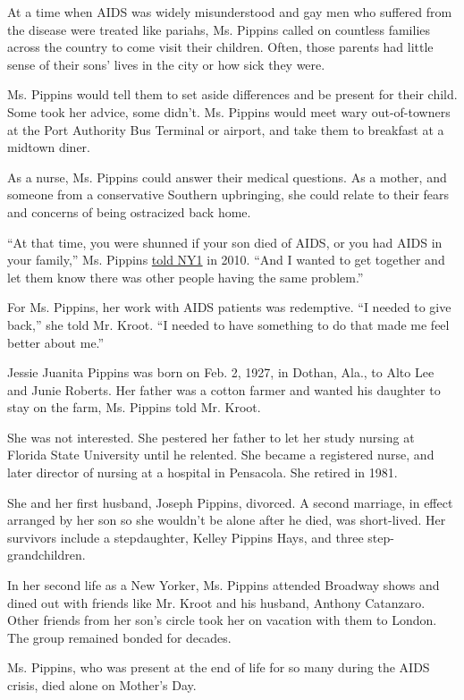 At a time when AIDS was widely misunderstood and gay men who suffered
from the disease were treated like pariahs, Ms. Pippins called on
countless families across the country to come visit their children.
Often, those parents had little sense of their sons' lives in the city
or how sick they were.

Ms. Pippins would tell them to set aside differences and be present for
their child. Some took her advice, some didn't. Ms. Pippins would meet
wary out-of-towners at the Port Authority Bus Terminal or airport, and
take them to breakfast at a midtown diner.

As a nurse, Ms. Pippins could answer their medical questions. As a
mother, and someone from a conservative Southern upbringing, she could
relate to their fears and concerns of being ostracized back home.

``At that time, you were shunned if your son died of AIDS, or you had
AIDS in your family,'' Ms. Pippins
\href{http://www.youtube.com/watch?v=JkzVku0hr3A}{told NY1} in 2010.
``And I wanted to get together and let them know there was other people
having the same problem.''

For Ms. Pippins, her work with AIDS patients was redemptive. ``I needed
to give back,'' she told Mr. Kroot. ``I needed to have something to do
that made me feel better about me.''

Jessie Juanita Pippins was born on Feb. 2, 1927, in Dothan, Ala., to
Alto Lee and Junie Roberts. Her father was a cotton farmer and wanted
his daughter to stay on the farm, Ms. Pippins told Mr. Kroot.

She was not interested. She pestered her father to let her study nursing
at Florida State University until he relented. She became a registered
nurse, and later director of nursing at a hospital in Pensacola. She
retired in 1981.

She and her first husband, Joseph Pippins, divorced. A second marriage,
in effect arranged by her son so she wouldn't be alone after he died,
was short-lived. Her survivors include a stepdaughter, Kelley Pippins
Hays, and three step-grandchildren.

In her second life as a New Yorker, Ms. Pippins attended Broadway shows
and dined out with friends like Mr. Kroot and his husband, Anthony
Catanzaro. Other friends from her son's circle took her on vacation with
them to London. The group remained bonded for decades.

Ms. Pippins, who was present at the end of life for so many during the
AIDS crisis, died alone on Mother's Day.

